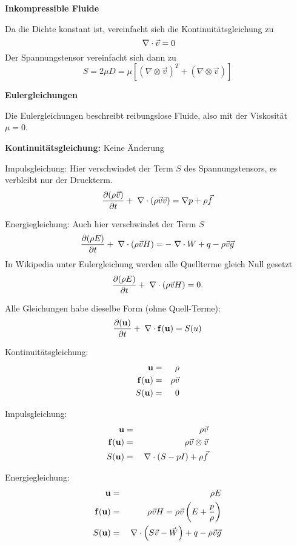 {\bf Inkompressible Fluide}

Da die Dichte konstant ist, vereinfacht sich die Kontinuitätsgleichung
zu
\[
\;\nabla \cdot \vec{v} = 0
\]
Der Spannungstensor vereinfacht sich dann zu
\[
S = 2 \mu D = \mu\left[ (\nabla \otimes \vec{v})^T + (\nabla \otimes \vec{v})\right]
\]

{\bf Eulergleichungen}

Die Eulergleichungen beschreibt reibungslose Fluide, also mit der Viskosität $\mu=0$.

{\bf Kontinuitätsgleichung:} Keine Änderung

Impulsgleichung: Hier verschwindet der Term $S$ des
Spannungstensors, es verbleibt nur der Druckterm.
\begin{equation}
\frac{\partial (\rho \vec{v})}{\partial t} + \;\nabla \cdot (\rho \vec{v} \vec{v})
= \nabla p + \rho \vec{f}
\end{equation}


Energiegleichung: Auch hier verschwindet der Term $S$
\begin{equation}
\frac{\partial (\rho E)}{\partial t} + \;\nabla \cdot (\rho \vec{v} H) = - \;\nabla \cdot
W + q - \rho \vec{v}\vec{g}
\end{equation}
In Wikipedia unter Eulergleichung werden alle Quellterme gleich Null gesetzt
\begin{equation}
\frac{\partial (\rho E)}{\partial t} + \;\nabla \cdot (\rho \vec{v} H) = 0.
\end{equation}

Alle Gleichungen habe dieselbe Form (ohne Quell-Terme):
\[
\frac{\partial (\mathbf{u})}{\partial t} + \;\nabla \cdot \mathbf{f(u)} = S(u)
\]

Kontinuitätsgleichung: 
\begin{eqnarray*}
\mathbf{u} &=& \rho\\
\mathbf{f(u)} &=& \rho \vec{v}\\
S(\mathbf{u}) &=& 0
\end{eqnarray*}

Impulsgleichung: 
\begin{eqnarray*}
\mathbf{u} &=& \rho \vec{v}\\
\mathbf{f(u)} &=& \rho \vec{v}\otimes\vec{v}\\
S(\mathbf{u}) &=& \;\nabla \cdot (S - p I)  + \rho \vec{f}
\end{eqnarray*}

Energiegleichung: 
\begin{eqnarray*}
\mathbf{u} &=& \rho E\\
\mathbf{f(u)} &=& \rho \vec{v} H = 
\rho \vec{v} \left(E + \frac{p}{\rho} \right)\\
S(\mathbf{u}) &=& \;\nabla \cdot \left(S \vec{v} - \vec{W}
\right) + q - \rho \vec{v}\vec{g} 
\end{eqnarray*}





